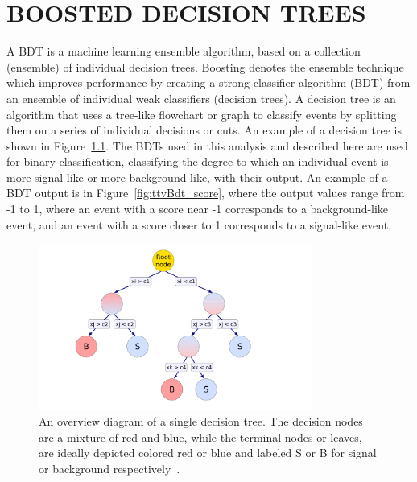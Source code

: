 %
%

\chapter{BOOSTED DECISION TREES}
\label{app:bdts}

A BDT is a machine learning ensemble algorithm, based on a collection (ensemble) of individual decision trees. Boosting denotes the ensemble technique
which improves performance by creating a strong classifier algorithm (BDT) from an ensemble of individual weak classifiers (decision trees). A decision tree
is an algorithm that uses a tree-like flowchart or graph to classify events by splitting them on a series of individual decisions or cuts. An example of a decision tree
is shown in Figure~\ref{fig:dec_tree}. The BDTs used in this analysis and described here are used for binary classification, classifying the degree to which an
individual event is more signal-like or more background like, with their output.
An example of a BDT output is in Figure~\ref{fig:ttvBdt_score}, where the output values range from -1 to 1, where an event with a score near -1 corresponds
to a background-like event, and an event with a score closer to 1 corresponds to a signal-like event.

\begin{figure}[hbtp]
 \begin{center}
   \includegraphics[width=0.8\textwidth]{ap1_figs/decision_tree.pdf}
   \caption[A decision tree diagram.]{An overview diagram of a single decision tree. The decision nodes are a mixture of red and blue,
     while the terminal nodes or leaves, are ideally depicted colored red or blue and labeled S or B for signal or background respectively~\cite{tmva}.}
   \label{fig:dec_tree}
 \end{center}
\end{figure}

